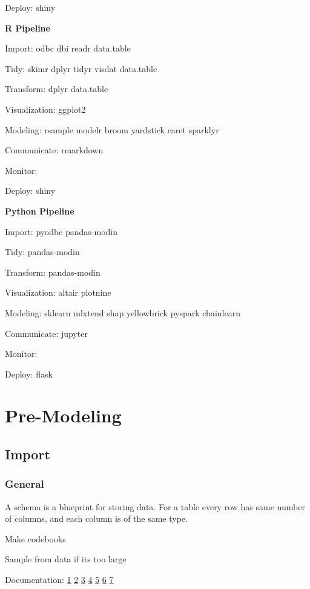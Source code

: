 \documentclass[]{book}
\begin{document}
Deploy: shiny

\textbf{R Pipeline}

Import: odbc dbi readr data.table

Tidy: skimr dplyr tidyr visdat data.table

Transform: dplyr data.table

Visualization: ggplot2

Modeling: rsample modelr broom yardstick caret sparklyr

Communicate: rmarkdown

Monitor:

Deploy: shiny

\textbf{Python Pipeline}

Import: pyodbc pandas-modin

Tidy: pandas-modin

Transform: pandas-modin

Visualization: altair plotnine

Modeling: sklearn mlxtend shap yellowbrick pyspark chainlearn

Communicate: jupyter

Monitor:

Deploy: flask

\hypertarget{pre-modeling-1}{%
\chapter{Pre-Modeling}\label{pre-modeling-1}}

\hypertarget{import}{%
\section{Import}\label{import}}

\hypertarget{general}{%
\subsection{General}\label{general}}

A schema is a blueprint for storing data. For a table every row has same number of columns, and each column is of the same type.

Make codebooks

Sample from data if its too large

Documentation: \href{http://databasenotetaker.com/}{1} \textbar{} \href{https://dataedo.com/}{2} \textbar{} \href{https://www.apexsql.com/sql-tools-doc.aspx}{3} \textbar{} \href{https://techwriter.me/best-practices-guide/documenting-databases.aspx}{4} \textbar{} \href{http://help.osf.io/m/bestpractices/l/618767-how-to-make-a-data-dictionary}{5} \textbar{} \href{https://dataedo.com/blog/different-types-of-tools-you-can-use-to-document-your-database}{6} \textbar{} \href{https://drawsql.app/\#features}{7}
\end{document}
